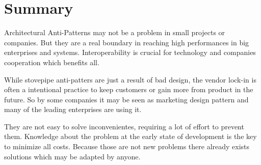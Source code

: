 \section{Summary}

Architectural Anti-Patterns may not be a problem in small projects or companies. But they are a real boundary in reaching high performances in big enterprises and systems. Interoperability is crucial for technology and companies cooperation which benefits all.

While stovepipe anti-patters are just a result of bad design, the vendor lock-in is often a intentional practice to keep customers or gain more from product in the future. So by some companies it may be seen as marketing design pattern and many of the leading enterprises are using it.

They are not easy to solve inconvenientes, requiring a lot of effort to prevent them. Knowledge about the problem at the early state of development is the key to minimize all costs. Because those are not new problems there already exists solutions which may be adapted by anyone.